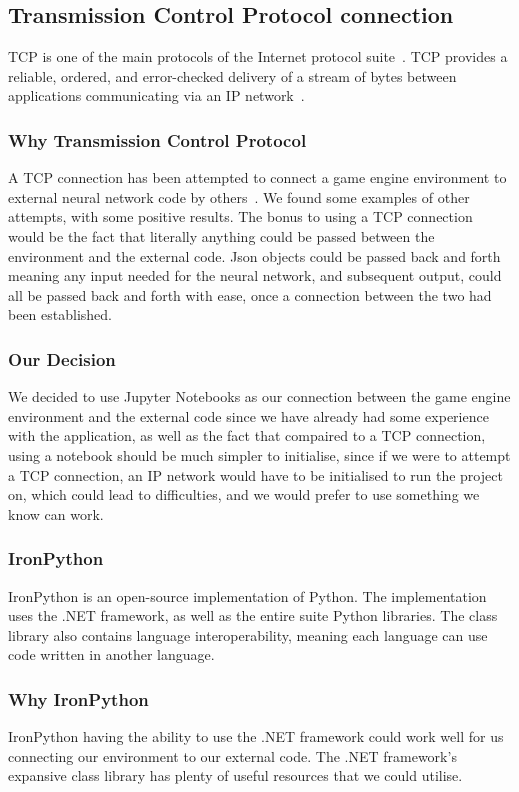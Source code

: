 \subsection{Transmission Control Protocol connection}
TCP is one of the main protocols of the Internet protocol suite~\cite{TCP}. 
TCP provides a reliable, ordered, and error-checked delivery of a stream of bytes between applications communicating via an IP network~\cite{TCPsdx}. 

\subsubsection{Why Transmission Control Protocol}
A TCP connection has been attempted to connect a game engine environment to external neural network code by others~\cite{UnityTCP}. We found some examples of other attempts, with some positive results. The bonus to using a TCP connection would be the fact that literally anything could be passed between the environment and the external code. Json objects could be passed back and forth meaning any input needed for the neural network, and subsequent output, could all be passed back and forth with ease, once a connection between the two had been established.

\subsubsection{Our Decision}
We decided to use Jupyter Notebooks as our connection between the game engine environment and the external code since we have already had some experience with the application, as well as the fact that compaired to a TCP connection, using a notebook should be much simpler to initialise, since if we were to attempt a TCP connection, an IP network would have to be initialised to run the project on, which could lead to difficulties, and we would prefer to use something we know can work.

\subsubsection{IronPython}
IronPython is an open-source implementation of Python. The implementation uses the .NET framework, as well as the entire suite Python libraries. The class library also contains language interoperability, meaning each language can use code written in another language.

\subsubsection{Why IronPython}
IronPython having the ability to use the .NET framework could work well for us connecting our environment to our external code. The .NET framework’s expansive class library has plenty of useful resources that we could utilise.

